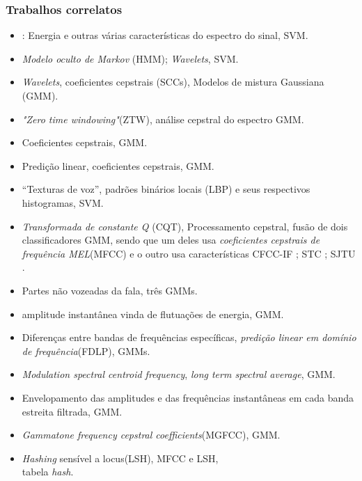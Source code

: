 \documentclass{beamer}
\begin{document}
	\begin{frame}[allowframebreaks]
		\frametitle{Trabalhos correlatos}
		\begin{itemize}
			\item \cite{Ren2019}: Energia e outras várias características do espectro do sinal, SVM.
			\item \cite{DiqunYan2019} \textit{Modelo oculto de Markov} (HMM); \textit{Wavelets}, SVM.
			\item \cite{7802552} \textit{Wavelets}, coeficientes cepstrais (SCCs), Modelos de mistura Gaussiana (GMM).
			\item \cite{alluri2019replay} \textit{"Zero time windowing"}(ZTW), análise cepstral do espectro GMM.
			\item \cite{8725688} Coeficientes cepstrais, GMM.
			\item \cite{Hanilci2018} Predição linear, coeficientes cepstrais, GMM.
			\item \cite{ISI:000473343500086} ``Texturas de voz'', padrões binários locais (LBP) e seus respectivos histogramas, SVM.
			\item \cite{TODISCO2017516} \textit{Transformada de constante Q} (CQT), Processamento cepstral, fusão de dois classificadores GMM, sendo que um deles usa \textit{coeficientes cepstrais de frequência MEL}(MFCC) e o outro usa características CFCC-IF \cite{Patel2015}; STC \cite{7472724}; SJTU \cite{korshunov2016overview}.
			\item \cite{ISI:000490497200068} Partes não vozeadas da fala, três GMMs.
			\item \cite{ISI:000465363900136} amplitude instantânea vinda de flutuações de energia, GMM.
			\item \cite{ISI:000465363900139} Diferenças entre bandas de frequências específicas, \textit{predição linear em domínio de frequência}(FDLP), GMMs.
			\item \cite{Suthokumar2018} \textit{Modulation  spectral  centroid  frequency}, \textit{long term spectral average}, GMM.
			\item \cite{ISI:000458728700054} Envelopamento das amplitudes e das frequências instantâneas em cada banda estreita filtrada, GMM.
			\item \cite{ISI:000392503100008} \textit{Gammatone frequency cepstral coefficients}(MGFCC), GMM.
			\item \cite{8396208} \textit{Hashing} sensível a locus(LSH), MFCC e LSH, \\
			tabela \textit{hash}. 
		\end{itemize}
	\end{frame}
\end{document}
